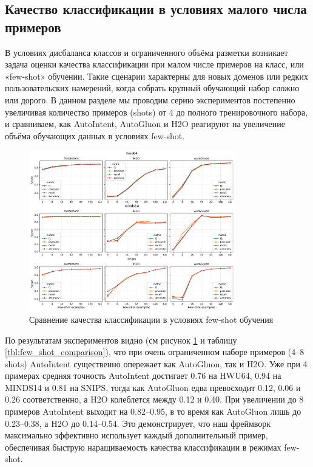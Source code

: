 \documentclass[14pt,a4paper,oneside,openany]{extbook}
\begin{document}
\subsection{Качество классификации в условиях малого числа примеров}
\label{sec:org103f2ae}
В условиях дисбаланса классов и ограниченного объёма разметки возникает задача оценки качества классификации при малом числе примеров на класс, или «few-shot» обучении. Такие сценарии характерны для новых доменов или редких пользовательских намерений, когда собрать крупный обучающий набор сложно или дорого. В данном разделе мы проводим серию экспериментов постепенно увеличивая количество примеров (shots) от 4 до полного тренировочного набора, и сравниваем, как AutoIntent, AutoGluon и H2O реагируют на увеличение объёма обучающих данных в условиях few-shot.

\begin{figure}[h!]
\centering
\includegraphics[width=0.8\textwidth]{img/comparison_few_shot_subfigures.pdf}
\caption{\label{fig:few_shot_comparison}Сравнение качества классификации в условиях few-shot обучения}
\end{figure}

По результатам экспериментов видно (см рисунок \ref{fig:few_shot_comparison} и таблицу \ref{tbl:few_shot_comparison}), что при очень ограниченном наборе примеров (4–8 shots) AutoIntent существенно опережает как AutoGluon, так и H2O. Уже при 4 примерах средняя точность AutoIntent достигает 0.76 на HWU64, 0.94 на MINDS14 и 0.81 на SNIPS, тогда как AutoGluon едва превосходит 0.12, 0.06 и 0.26 соответственно, а H2O колеблется между 0.12 и 0.40. При увеличении до 8 примеров AutoIntent выходит на 0.82–0.95, в то время как AutoGluon лишь до 0.23–0.38, а H2O до 0.14–0.54. Это демонстрирует, что наш фреймворк максимально эффективно использует каждый дополнительный пример, обеспечивая быструю наращиваемость качества классификации в режимах few-shot.
\end{document}
